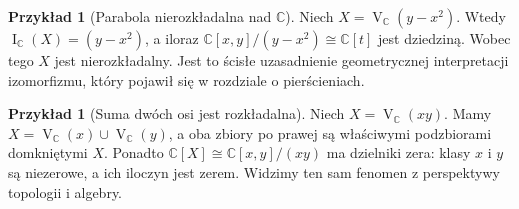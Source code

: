 \documentclass[11pt,a4paper,openany]{report}
\numberwithin{equation}{section}
\theoremstyle{plain}
\theoremstyle{definition}
\newtheorem{przyklad}[twierdzenie]{Przykład}
\theoremstyle{remark}
\newcommand{\C}{\mathbb C}
\newcommand{\V}{\operatorname V}
\newcommand{\I}{\operatorname I}
\begin{document}
\begin{przyklad}[Parabola nierozkładalna nad $\C$]
Niech $X=\V_{\C}(y-x^2)$.
Wtedy $\I_{\C}(X)=(y-x^2)$, a iloraz
$\C[x,y]/(y-x^2)\cong\C[t]$ jest dziedziną.
Wobec tego $X$ jest nierozkładalny.
Jest to ścisłe uzasadnienie geometrycznej interpretacji
izomorfizmu, który pojawił się w rozdziale o pierścieniach.
\end{przyklad}

\begin{przyklad}[Suma dwóch osi jest rozkładalna]
Niech $X=\V_{\C}(xy)$.
Mamy $X=\V_{\C}(x)\cup\V_{\C}(y)$,
a oba zbiory po prawej są właściwymi podzbiorami domkniętymi
$X$. Ponadto $\C[X]\cong\C[x,y]/(xy)$ ma dzielniki zera:
klasy $x$ i $y$ są niezerowe, a ich iloczyn jest zerem.
Widzimy ten sam fenomen z perspektywy topologii i algebry.
\end{przyklad}
\end{document}
